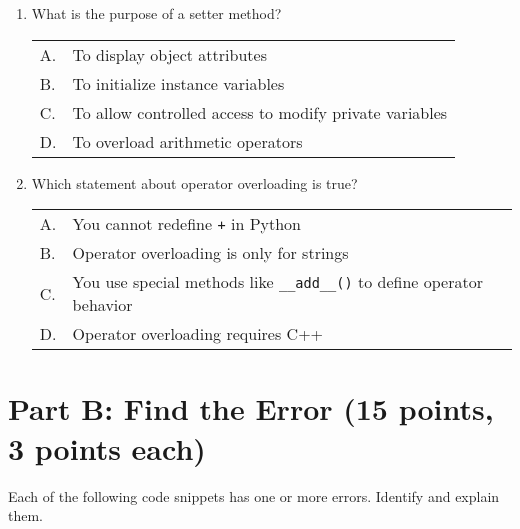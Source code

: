 \documentclass[11pt]{article}
\begin{document}
\begin{enumerate}[label=\arabic*.]
    \item What is the purpose of a setter method? \\
    \begin{tabular}{ll}
        A. & To display object attributes \\
        B. & To initialize instance variables \\
        C. & To allow controlled access to modify private variables \\
        D. & To overload arithmetic operators
    \end{tabular}

    \item Which statement about operator overloading is true? \\
    \begin{tabular}{ll}
        A. & You cannot redefine \verb|+| in Python \\
        B. & Operator overloading is only for strings \\
        C. & You use special methods like \verb|__add__()| to define operator behavior \\
        D. & Operator overloading requires C++
    \end{tabular}
\end{enumerate}

\newpage

\section*{Part B: Find the Error (15 points, 3 points each)}
Each of the following code snippets has one or more errors. Identify and explain them.
\end{document}
